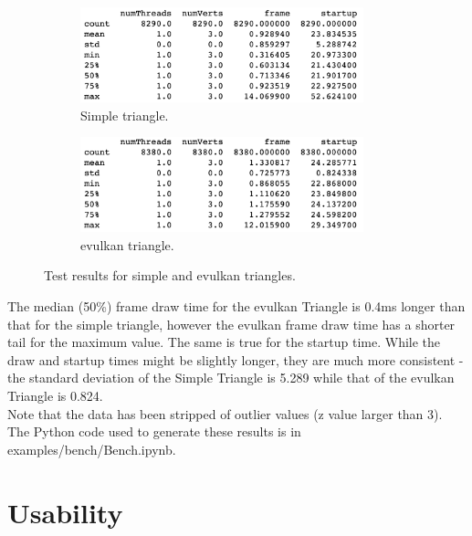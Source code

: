 \documentclass[12pt]{report}
\theoremstyle{definition}
\begin{document}
        \begin{figure}[h]
          \begin{subfigure}[b]{0.5\textwidth}
            \centering
            \includegraphics[width=0.9\textwidth]{images/simple_describe.png}
            \caption{Simple triangle.}
          \end{subfigure}
          \begin{subfigure}[b]{0.5\textwidth}
            \centering
            \includegraphics[width=0.9\textwidth]{images/evk_describe.png}
            \caption{evulkan triangle.}
          \end{subfigure}
          \caption{Test results for simple and evulkan triangles.}
          \label{fig:test_describe}                        
        \end{figure}

        The median (50\%) frame draw time for the evulkan Triangle is 0.4ms
        longer than that for the simple triangle, however the evulkan frame
        draw time has a shorter tail for the maximum value.  The same is true
        for the startup time. While the draw and startup times might be
        slightly longer, they are much more consistent - the standard
        deviation of the Simple Triangle is 5.289 while that of the evulkan
        Triangle is 0.824. \\

        Note that the data has been stripped of outlier values (z value larger than 3).
        The Python code used to generate these results is in examples/bench/Bench.ipynb.

    \section{Usability}
\end{document}
